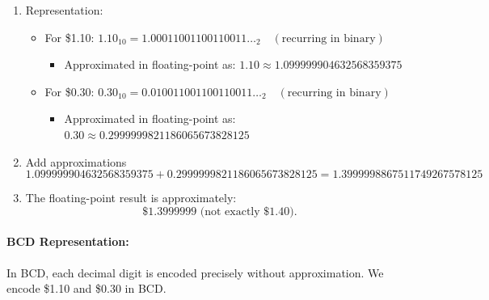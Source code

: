 \begin{enumerate}
    \item Representation:
    \begin{itemize}
        \item  For \$1.10:
     \(
     1.10_{10} = 1.00011001100110011\ldots_2 \quad (\text{recurring in binary})
     \)    
     \begin{itemize}

     \item Approximated in floating-point as:
     \(
     1.10 \approx 1.099999904632568359375
     \)
    \end{itemize}
    
   \item For \$0.30:
     \(
     0.30_{10} = 0.010011001100110011\ldots_2 \quad (\text{recurring in binary})
     \)
     \begin{itemize}
     \item Approximated in floating-point as:
     \(
     0.30 \approx 0.2999999821186065673828125
     \)
     \end{itemize}     
    \end{itemize}

    \item Add approximations
   \[
   1.099999904632568359375 + 0.2999999821186065673828125 = 1.3999998867511749267578125
   \]

    \item The floating-point result is approximately:
   \[
   \text{\$1.3999999 (not exactly \$1.40)}.
   \]
    
\end{enumerate}

\paragraph{BCD Representation:}
In BCD, each decimal digit is encoded precisely without approximation. We encode \$1.10 and \$0.30 in BCD.


